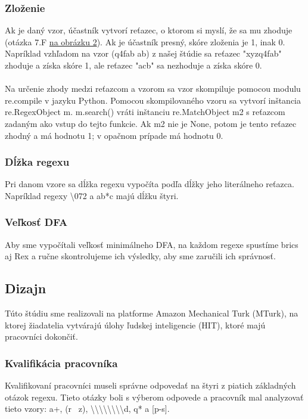 \documentclass[10pt,twoside,slovak,a4paper]{article}
\begin{document}
\subsubsection{Zloženie}
Ak je daný vzor, účastník vytvorí reťazec, o ktorom si myslí, že sa mu zhoduje (otázka 7.F \hyperref[fig:obrazok2]{na obrázku 2}). Ak je účastník presný, skóre zloženia je 1, inak 0. Napríklad vzhľadom na vzor (q4fab \textbar ab) z našej štúdie sa reťazec "xyzq4fab" zhoduje a získa skóre 1, ale reťazec "acb" sa nezhoduje a získa skóre 0.\cite{Chapman2017}\\\\
Na určenie zhody medzi reťazcom a vzorom sa vzor skompiluje pomocou modulu re.compile v jazyku Python. Pomocou skompilovaného vzoru sa vytvorí inštancia re.RegexObject m. m.search() vráti inštanciu re.MatchObject m2 s reťazcom zadaným ako vstup do tejto funkcie. Ak m2 nie je None, potom je tento reťazec zhodný a má hodnotu 1; v opačnom prípade má hodnotu 0.\cite{Chapman2017}
\subsubsection{Dĺžka regexu}
Pri danom vzore sa dĺžka regexu vypočíta podľa dĺžky jeho literálneho reťazca. Napríklad regexy \textbackslash 072 a ab*c majú dĺžku štyri.\cite{Chapman2017}
\subsubsection{Veľkosť DFA}
Aby sme vypočítali veľkosť minimálneho DFA, na každom regexe spustíme brics  aj Rex \cite{5477051} a ručne skontrolujeme ich výsledky, aby sme zaručili ich správnosť.\cite{Chapman2017}
\subsection{Dizajn}
Túto štúdiu sme realizovali na platforme Amazon Mechanical Turk (MTurk), na ktorej žiadatelia vytvárajú úlohy ľudskej inteligencie (HIT), ktoré majú pracovníci dokončiť.\cite{Chapman2017}
\subsubsection{Kvalifikácia pracovníka}
Kvalifikovaní pracovníci museli správne odpovedať na štyri z piatich základných otázok regexu. Tieto otázky boli s výberom odpovede a pracovník mal analyzovať tieto vzory: a+, (r \textbar \ z), \textbackslash \textbackslash \textbackslash \textbackslash \textbackslash \textbackslash \textbackslash \textbackslash d, q* a [p-s].\cite{Chapman2017}
\end{document}
